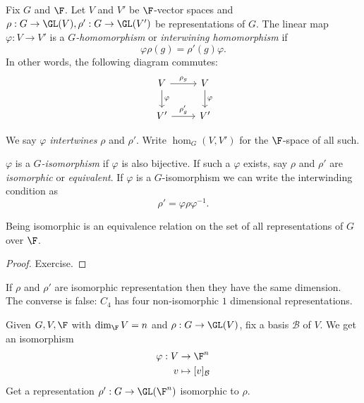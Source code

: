 \documentclass[a4paper]{article}
\begin{document}
\begin{definition}
  Fix \(G\) and \(\F\). Let \(V\) and \(V'\) be \(\F\)-vector spaces and \(\rho: G \to \GL(V), \rho': G \to \GL(V')\) be representations of \(G\). The linear map \(\varphi: V \to V'\) is a \emph{\(G\)-homomorphism} or \emph{interwining homomorphism} if
  \[
    \varphi \rho(g) = \rho'(g) \varphi.
  \]
  In other words, the following diagram commutes:
  \[
    \begin{tikzcd}
      V \ar[r, "\rho_g"] \ar[d, "\varphi"] & V \ar[d, "\varphi"] \\
      V' \ar[r, "\rho_g'"] & V'
    \end{tikzcd}
  \]

  We say \(\varphi\) \emph{intertwines} \(\rho\) and \(\rho'\). Write \(\hom_G(V, V')\) for the \(\F\)-space of all such.

  \(\varphi\) is a \emph{\(G\)-isomorphism} if \(\varphi\) is also bijective. If such a \(\varphi\) exists, say \(\rho\) and \(\rho'\) are \emph{isomorphic} or \emph{equivalent}. If \(\varphi\) is a \(G\)-isomorphism we can write the interwinding condition as
  \[
    \rho' = \varphi \rho \varphi^{-1}.
  \]
\end{definition}

\begin{lemma}
  Being isomorphic is an equivalence relation on the set of all representations of \(G\) over \(\F\).
\end{lemma}

\begin{proof}
  Exercise.
\end{proof}

\begin{remark}
  If \(\rho\) and \(\rho'\) are isomorphic representation then they have the same dimension. The converse is false:  \(C_4\) has four non-isomorphic \(1\) dimensional representations.
\end{remark}

\begin{remark}
  Given \(G, V, \F\) with \(\dim_\F V = n\) and \(\rho: G \to \GL(V)\), fix a basis \(\mathcal B\) of \(V\). We get an isomorphism
  \begin{align*}
    \varphi: V &\to \F^n \\
    v &\mapsto [v]_{\mathcal B}
  \end{align*}
  Get a representation \(\rho': G \to \GL(\F^n)\) isomorphic to \(\rho\).
\end{remark}







\printindex
\end{document}
